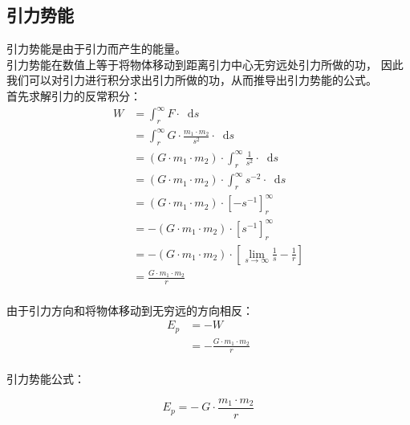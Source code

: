 \documentclass[UTF8]{ctexart}
\newcommand*{\dif}{\mathop{}\!\mathrm{d}}
\begin{document}
\newpage
        
\subsection{引力势能}
    引力势能是由于引力而产生的能量。\\[3mm]
    引力势能在数值上等于将物体移动到距离引力中心无穷远处引力所做的功，
    因此我们可以对引力进行积分求出引力所做的功，从而推导出引力势能的公式。\\[5mm]
    首先求解引力的反常积分：
    \setcounter{equation}{0}
    \begin{align}    
        W&=\int_{r}^{\infty} F\cdot\dif s\\[3mm]
        &= \int_{r}^{\infty} G \cdot \frac{m_{1} \cdot m_{2}}{{s}^{2}}\cdot\dif s \\[3mm]
        &=(G \cdot m_{1} \cdot m_{2}) \cdot \int_{r}^{\infty} \frac{1}{{s}^{2}}\cdot\dif s \\[3mm]
        &=(G \cdot m_{1} \cdot m_{2}) \cdot \int_{r}^{\infty} {s}^{-2}\cdot\dif s \\[3mm]
        &=(G \cdot m_{1} \cdot m_{2})\cdot\left[-{s}^{-1}\right]_{r}^{\infty} \\[4mm]
        &=-(G \cdot m_{1} \cdot m_{2})\cdot\left[{s}^{-1}\right]_{r}^{\infty} \\[3mm]
        &=-(G \cdot m_{1} \cdot m_{2})\cdot\left[\lim_{s\to\infty}\frac{1}{s}-\frac{1}{r}\right] \\[3mm]
        &=\frac{G\cdot m_{1}\cdot m_{2}}{r}
    \end{align}\\
    由于引力方向和将物体移动到无穷远的方向相反：\vspace{3pt}
    \begin{align}
        E_p
        &=-W\\[4mm]
        &=-\frac{G\cdot m_{1}\cdot m_{2}}{r}
    \end{align}\\
    引力势能公式：
    \begin{large}
        \begin{equation*}
            E_{p} = -\ G \cdot \dfrac{m_{1} \cdot m_{2}}{r}
        \end{equation*}
    \end{large}

\newpage
\end{document}
